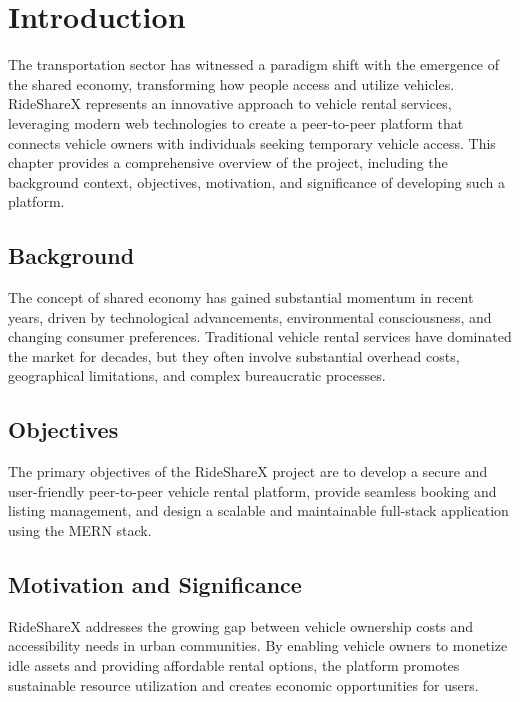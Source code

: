 \chapter{Introduction}

The transportation sector has witnessed a paradigm shift with the emergence of the shared economy, transforming how people access and utilize vehicles. RideShareX represents an innovative approach to vehicle rental services, leveraging modern web technologies to create a peer-to-peer platform that connects vehicle owners with individuals seeking temporary vehicle access. This chapter provides a comprehensive overview of the project, including the background context, objectives, motivation, and significance of developing such a platform.

\section{Background}
The concept of shared economy has gained substantial momentum in recent years, driven by technological advancements, environmental consciousness, and changing consumer preferences. Traditional vehicle rental services have dominated the market for decades, but they often involve substantial overhead costs, geographical limitations, and complex bureaucratic processes.

\section{Objectives}
The primary objectives of the RideShareX project are to develop a secure and user-friendly peer-to-peer vehicle rental platform, provide seamless booking and listing management, and design a scalable and maintainable full-stack application using the MERN stack.

\section{Motivation and Significance}
RideShareX addresses the growing gap between vehicle ownership costs and accessibility needs in urban communities. By enabling vehicle owners to monetize idle assets and providing affordable rental options, the platform promotes sustainable resource utilization and creates economic opportunities for users.
